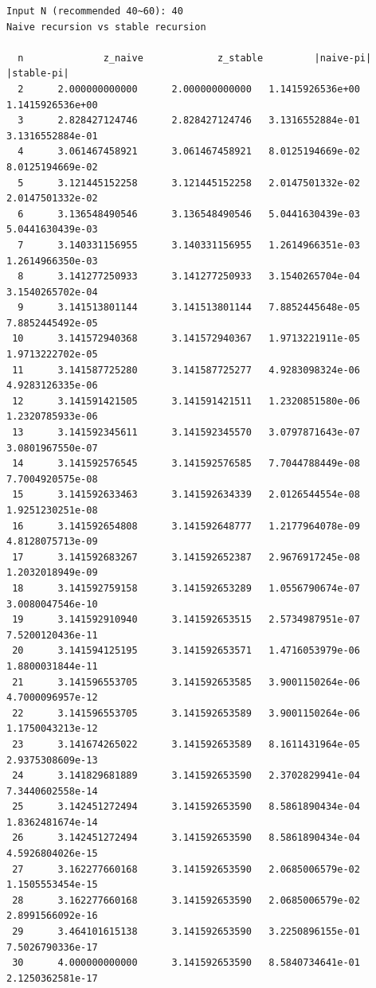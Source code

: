 \documentclass[12pt,a4paper]{article}
\begin{document}
\begin{lstlisting}
Input N (recommended 40~60): 40
Naive recursion vs stable recursion

  n              z_naive             z_stable         |naive-pi|        |stable-pi|
  2      2.000000000000      2.000000000000   1.1415926536e+00   1.1415926536e+00
  3      2.828427124746      2.828427124746   3.1316552884e-01   3.1316552884e-01
  4      3.061467458921      3.061467458921   8.0125194669e-02   8.0125194669e-02
  5      3.121445152258      3.121445152258   2.0147501332e-02   2.0147501332e-02
  6      3.136548490546      3.136548490546   5.0441630439e-03   5.0441630439e-03
  7      3.140331156955      3.140331156955   1.2614966351e-03   1.2614966350e-03
  8      3.141277250933      3.141277250933   3.1540265704e-04   3.1540265702e-04
  9      3.141513801144      3.141513801144   7.8852445648e-05   7.8852445492e-05
 10      3.141572940368      3.141572940367   1.9713221911e-05   1.9713222702e-05
 11      3.141587725280      3.141587725277   4.9283098324e-06   4.9283126335e-06
 12      3.141591421505      3.141591421511   1.2320851580e-06   1.2320785933e-06
 13      3.141592345611      3.141592345570   3.0797871643e-07   3.0801967550e-07
 14      3.141592576545      3.141592576585   7.7044788449e-08   7.7004920575e-08
 15      3.141592633463      3.141592634339   2.0126544554e-08   1.9251230251e-08
 16      3.141592654808      3.141592648777   1.2177964078e-09   4.8128075713e-09
 17      3.141592683267      3.141592652387   2.9676917245e-08   1.2032018949e-09
 18      3.141592759158      3.141592653289   1.0556790674e-07   3.0080047546e-10
 19      3.141592910940      3.141592653515   2.5734987951e-07   7.5200120436e-11
 20      3.141594125195      3.141592653571   1.4716053979e-06   1.8800031844e-11
 21      3.141596553705      3.141592653585   3.9001150264e-06   4.7000096957e-12
 22      3.141596553705      3.141592653589   3.9001150264e-06   1.1750043213e-12
 23      3.141674265022      3.141592653589   8.1611431964e-05   2.9375308609e-13
 24      3.141829681889      3.141592653590   2.3702829941e-04   7.3440602558e-14
 25      3.142451272494      3.141592653590   8.5861890434e-04   1.8362481674e-14
 26      3.142451272494      3.141592653590   8.5861890434e-04   4.5926804026e-15
 27      3.162277660168      3.141592653590   2.0685006579e-02   1.1505553454e-15
 28      3.162277660168      3.141592653590   2.0685006579e-02   2.8991566092e-16
 29      3.464101615138      3.141592653590   3.2250896155e-01   7.5026790336e-17
 30      4.000000000000      3.141592653590   8.5840734641e-01   2.1250362581e-17

\end{lstlisting}
\end{document}
